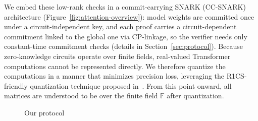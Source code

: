 \documentclass[runningheads]{llncs}
\begin{document}
We embed these low-rank checks in a commit-carrying SNARK (CC-SNARK) architecture (Figure~\ref{fig:attention-overview}): model weights are committed once under a circuit-independent key, and each proof carries a circuit-dependent commitment linked to the global one via CP-linkage, so the verifier needs only constant-time commitment checks (details in Section~\ref{sec:protocol}).
Because zero-knowledge circuits operate over finite fields, real-valued Transformer computations cannot be represented directly. We therefore quantize the computations in a manner that minimizes precision loss, leveraging the R1CS-friendly quantization technique proposed in~\cite{ZEN}. From this point onward, all matrices are understood to be over the finite field $\mathbb{F}$ after quantization.

\begin{figure}[!ht]
\centering
\newsavebox{\protocolbox}
%
\resizebox{\columnwidth}{!}{\usebox{\protocolbox}}
    \caption{Our protocol}
    \label{fig:protocol}
\end{figure}
\end{document}
